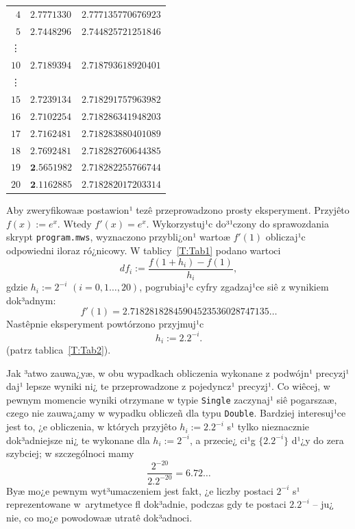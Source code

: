 \documentclass[11pt,leqno]{article}
\begin{document}
\begin{table}[!h]
\begin{center}
\begin{minipage}{8cm}
\begin{center}
\begin{tabular}{r|l|l}
$4$ & $\bm{2.7}771330$ & $\bm{2.7}77135770676923$ \\ 
$5$ & $\bm{2.7}448296$ & $\bm{2.7}44825721251846$ \\ 
\vdots &  & \\
$10$ & $\bm{2.71}89394$ & $\bm{2.718}793618920401$ \\ 
\vdots &  & \\
$15$ & $\bm{2.7}239134$ & $\bm{2.7182}91757963982$ \\ 
$16$ & $\bm{2.71}02254$ & $\bm{2.71828}6341948203$ \\ 
$17$ & $\bm{2.71}62481$ & $\bm{2.71828}3880401089$ \\ 
$18$ & $\bm{2.7}692481$ & $\bm{2.71828}2760644385$ \\ 
$19$ & $\bm{2}.5651982$ & $\bm{2.71828}2255766744$ \\ 
$20$ & $\bm{2}.1162885$ & $\bm{2.71828}2017203314$ \\ 
\end{tabular}
\end{center}
\end{minipage}
\end{center}
\end{table}

\begin{samepage}
Aby zweryfikowaæ postawion¹ tezê przeprowadzono prosty eksperyment. Przyjêto
$f(x):=e^x$. Wtedy $f'(x)=e^x$. Wykorzystuj¹c do³¹czony do sprawozdania skrypt
\texttt{program.mws}, wyznaczono przybli¿on¹ wartoæ $f'(1)$ obliczaj¹c
odpowiedni iloraz ró¿nicowy. W tablicy~\ref{T:Tab1} podano wartoci
\begin{equation}\label{E:Iloraz}
df_i:=\frac{f(1+h_i)-f(1)}{h_i},
\end{equation}
gdzie $h_i:=2^{-i}$ $(i=0,1\ldots,20)$, pogrubiaj¹c cyfry zgadzaj¹ce siê
z wynikiem dok³adnym:
$$
f'(1)=2.71828182845904523536028747135\ldots
$$
Nastêpnie eksperyment powtórzono przyjmuj¹c
$$
h_i:=2.2^{-i}.
$$
(patrz tablica~\ref{T:Tab2}).
\end{samepage}

Jak ³atwo zauwa¿yæ, w obu wypadkach obliczenia wykonane z podwójn¹ precyzj¹
daj¹ lepsze wyniki ni¿ te przeprowadzone z pojedyncz¹ precyzj¹. Co wiêcej, 
w pewnym momencie wyniki otrzymane w typie \texttt{Single} zaczynaj¹ siê
pogarszaæ, czego nie zauwa¿amy w wypadku obliczeñ dla typu \texttt{Double}.
Bardziej interesuj¹ce jest to, ¿e obliczenia, w których przyjêto
$h_i:=2.2^{-i}$ s¹ tylko nieznacznie dok³adniejsze ni¿ te wykonane dla
$h_i:=2^{-i}$, a przecie¿ ci¹g $\{2.2^{-i}\}$ d¹¿y do zera szybciej;  
w szczególnoci mamy
$$
\frac{2^{-20}}{2.2^{-20}}=6.72\ldots
$$
Byæ mo¿e pewnym wyt³umaczeniem jest fakt, ¿e liczby postaci $2^{-i}$ s¹
reprezentowane w~arytmetyce \textsf{fl} dok³adnie, podczas gdy te postaci 
$2.2^{-i}$ -- ju¿ nie, co mo¿e powodowaæ utratê dok³adnoci. 
\end{document}
